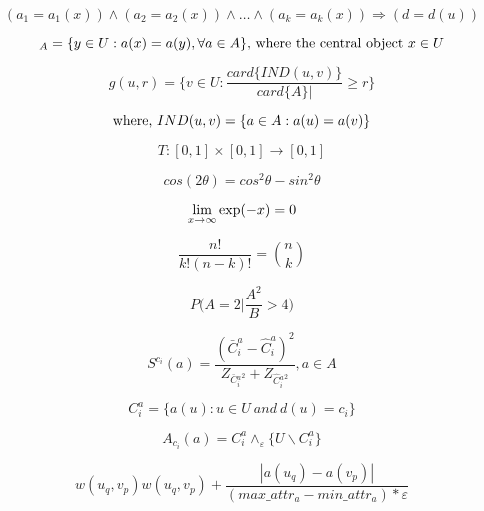 \documentclass[a4paper,12pt]{article}
\begin{document}
\begin{equation}
(a_1=a_1(x))\wedge(a_2=a_2(x))\wedge\dots\wedge(a_k=a_k(x))\Rightarrow(d=d(u))
\end{equation}

\begin{equation}
[x]_A=\{y\in U:a(x)=a(y),\forall a \in A \} \textnormal{, where the central object} \  x \in U
\end{equation}

\begin{equation}
g(u,r)=\{v \in U: \frac{card\{IND(u,v)\}}{card\{A\}|} \geq r \}
\end{equation}

\begin{equation}
\textnormal{where,} \ IND(u,v)= \{ a \in A:a(u)=a(v) \}
\end{equation}

\begin{equation}
T:[0,1] \times [0,1] \rightarrow [0,1]
\end{equation}

\begin{equation}
cos(2\theta )=cos^2\theta - sin^2\theta
\end{equation}

\begin{equation}
\lim\limits_{x \to \infty} \textnormal{exp}(-x)=0
\end{equation}

\begin{equation}
\frac{n!}{k!(n-k)!}={n\choose k}
\end{equation}

\begin{equation}
P\Bigg(A=2\Bigg|\frac{A^2}{B} > 4 \Bigg)
\end{equation}

\begin{equation}
S^{c_i}(a)=\frac{(\bar{C}^a_i-\hat{C}^a_i)^2}{Z_{\bar{C}{^a_i}^2}+Z_{\hat{C}{^a_i}^2}},a \in A
\end{equation}

\begin{equation}
C^a_i=\{a(u):u\in U \ and \ d(u) =c_i\}
\end{equation}

\begin{equation}
A_{c_i}(a)=C^a_i \wedge_\varepsilon \{U\backslash C^a_i\}
\end{equation}

\begin{equation}
w(u_q,v_p)w(u_q,v_p)+\frac{|a(u_q)-a(v_p)|}{(max\_attr_a-min\_attr_a)\ast \varepsilon}
\end{equation}
\end{document}
